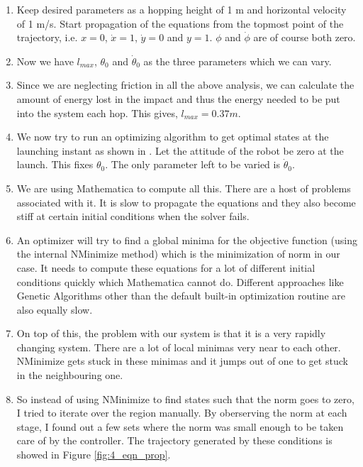 \begin{enumerate}
  \item
  Keep desired parameters as a hopping height of 1 m and horizontal velocity of 1 m/s. Start propagation 
  of the equations from the topmost point of the trajectory, i.e. $x = 0$, $\dot{x} = 1$, $\dot{y} = 0$ 
  and $y = 1$. $\phi$ and $\dot{\phi}$ are of course both zero.
  \item
  Now we have $l_{max}$, $\theta_0$ and $\dot{\theta}_0$ as the three parameters which we can vary.
  \item
  Since we are neglecting friction in all the above analysis, we can calculate the amount of energy lost in the impact and thus the energy needed to be put into the system each hop. This gives, $l_{max} = 0.37 m$.
  \item
  We now try to run an optimizing algorithm to get optimal states at the launching instant as shown in \cite{ga_init}. Let the attitude of the robot be zero at the launch. This fixes $\theta_0$. The only parameter left to be varied is $\dot{\theta}_0$.
  \item
  We are using Mathematica to compute all this. There are a host of problems associated with it. It is slow to propagate the equations and they also become stiff at certain initial conditions when the solver fails. 
  \item
  An optimizer will try to find a global minima for the objective function (using the internal NMinimize method) which is the minimization of norm in our case. It needs to compute these equations for a lot of different initial conditions quickly which Mathematica cannot do. Different approaches like Genetic Algorithms other than the default built-in optimization routine are also equally slow.
  \item
  On top of this, the problem with our system is that it is a very rapidly changing system. There are a lot of local minimas very near to each other. NMinimize gets stuck in these minimas and it jumps out of one to get stuck in the neighbouring one.
  \item
  So instead of using NMinimize to find states such that the norm goes to zero, I tried to iterate over the region manually. By oberserving the norm at each stage, I found out a few sets where the norm was small enough to be taken care of by the controller. The trajectory generated by these conditions is showed in Figure \ref{fig:4_eqn_prop}.
\end{enumerate}

